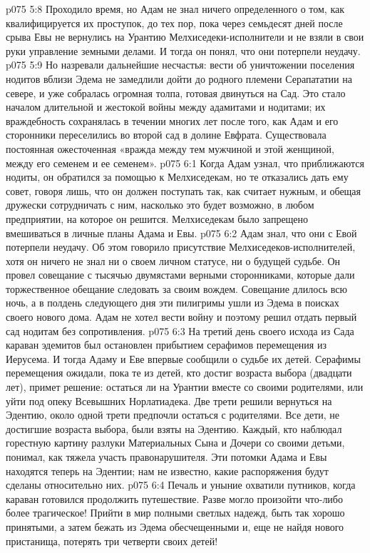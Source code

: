 \vs p075 5:8 \pc Проходило время, но Адам не знал ничего определенного о том, как квалифицируется их проступок, до тех пор, пока через семьдесят дней после срыва Евы не вернулись на Урантию Мелхиседеки\hyp{}исполнители и не взяли в свои руки управление земными делами. И тогда он понял, что они потерпели неудачу.
\vs p075 5:9 \pc Но назревали дальнейшие несчастья: вести об уничтожении поселения нодитов вблизи Эдема не замедлили дойти до родного племени Серапататии на севере, и уже собралась огромная толпа, готовая двинуться на Сад. Это стало началом длительной и жестокой войны между адамитами и нодитами; их враждебность сохранялась в течении многих лет после того, как Адам и его сторонники переселились во второй сад в долине Евфрата. Существовала постоянная ожесточенная «вражда между тем мужчиной и этой женщиной, между его семенем и ее семенем».
\vs p075 6:1 Когда Адам узнал, что приближаются нодиты, он обратился за помощью к Мелхиседекам, но те отказались дать ему совет, говоря лишь, что он должен поступать так, как считает нужным, и обещая дружески сотрудничать с ним, насколько это будет возможно, в любом предприятии, на которое он решится. Мелхиседекам было запрещено вмешиваться в личные планы Адама и Евы.
\vs p075 6:2 Адам знал, что они с Евой потерпели неудачу. Об этом говорило присутствие Мелхиседеков\hyp{}исполнителей, хотя он ничего не знал ни о своем личном статусе, ни о будущей судьбе. Он провел совещание с тысячью двумястами верными сторонниками, которые дали торжественное обещание следовать за своим вождем. Совещание длилось всю ночь, а в полдень следующего дня эти пилигримы ушли из Эдема в поисках своего нового дома. Адам не хотел вести войну и поэтому решил отдать первый сад нодитам без сопротивления.
\vs p075 6:3 На третий день своего исхода из Сада караван эдемитов был остановлен прибытием серафимов перемещения из Иерусема. И тогда Адаму и Еве впервые сообщили о судьбе их детей. Серафимы перемещения ожидали, пока те из детей, кто достиг возраста выбора (двадцати лет), примет решение: остаться ли на Урантии вместе со своими родителями, или уйти под опеку Всевышних Норлатиадека. Две трети решили вернуться на Эдентию, около одной трети предпочли остаться с родителями. Все дети, не достигшие возраста выбора, были взяты на Эдентию. Каждый, кто наблюдал горестную картину разлуки Материальных Сына и Дочери со своими детьми, понимал, как тяжела участь правонарушителя. Эти потомки Адама и Евы находятся теперь на Эдентии; нам не известно, какие распоряжения будут сделаны относительно них.
\vs p075 6:4 Печаль и уныние охватили путников, когда караван готовился продолжить путешествие. Разве могло произойти что\hyp{}либо более трагическое! Прийти в мир полными светлых надежд, быть так хорошо принятыми, а затем бежать из Эдема обесчещенными и, еще не найдя нового пристанища, потерять три четверти своих детей!
